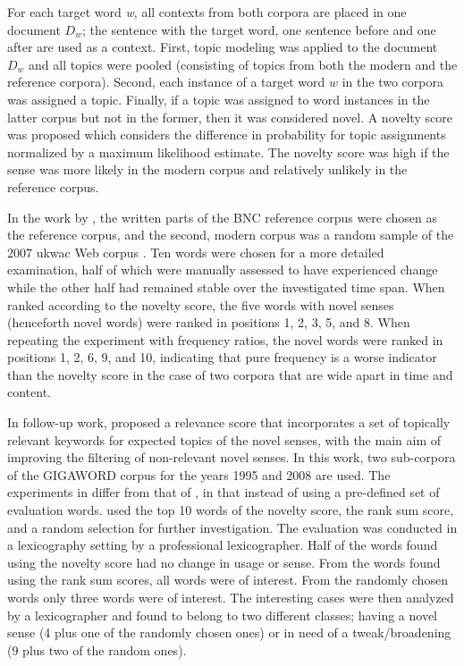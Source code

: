 \documentclass[output=paper]{langsci/langscibook}
\begin{document}
For each target word \textit{w}, all contexts from both corpora are placed in one document $D_w$; the sentence with the target word, one sentence before and one after are used as a context. 
First, topic modeling was applied to the document $D_w$ and all topics were pooled (consisting of topics from both the modern and the reference corpora). 
 Second, each instance of a target word $w$ in the two corpora was assigned a topic. 
 Finally, if a topic was assigned to word instances in the latter corpus but not in the former, then it was considered novel. A novelty score was proposed which considers the difference in probability for topic assignments normalized by a maximum likelihood estimate. The novelty score was high if the sense was more likely in the modern corpus and relatively unlikely in the reference corpus. 

In the work by \citet{lau-etal-2012-word}, the written parts of the BNC reference corpus were chosen as the reference corpus, and the second, modern corpus was a random sample of the 2007 ukwac Web corpus \citep{ukwac}. Ten words were chosen for a more detailed examination, half of which were manually assessed to have experienced change while the other half had remained stable over the investigated time span. When ranked according to the novelty score, the five words with novel senses (henceforth novel words) were ranked in positions 1, 2, 3, 5, and 8. When repeating the experiment with frequency ratios, the novel words were ranked in positions 1, 2, 6, 9, and 10, indicating that pure frequency is a worse indicator than the novelty score in the case of two corpora that are wide apart in time and content. 


In follow-up work, \citet{cook13alexicographic} proposed  a relevance score that incorporates a set of topically relevant keywords for expected topics of the novel senses, with the main aim of improving the filtering of non-relevant novel senses. In this work, two sub-corpora  of the GIGAWORD corpus for  the  years  1995 and  2008 are used. The experiments in \citet{cook13alexicographic} differ from that of \citet{lau-etal-2012-word}, in that instead of using a pre-defined set of evaluation words. \citet{cook13alexicographic} used the top 10 words of the novelty score, the rank sum score, and a random selection for further investigation. The evaluation was conducted in a lexicography setting by a professional lexicographer. Half of the words found using the novelty score had no change in usage or sense. From the words found using the rank sum scores, all words were of interest. From the randomly chosen words only three words were of interest. The interesting cases were then  analyzed by a lexicographer and found to belong to two different classes; having a novel sense (4 plus one of the randomly chosen ones) or in need of a tweak/broadening (9 plus two of the random ones). 
\end{document}
